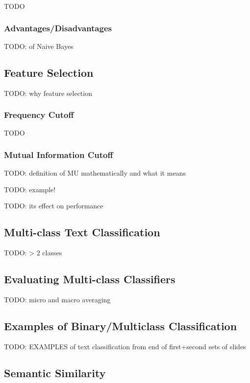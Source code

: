 \documentclass{article}
\begin{document}
TODO

\subsubsection{Advantages/Disadvantages}

TODO: of Naive Bayes

\subsection{Feature Selection}

TODO: why feature selection

\subsubsection{Frequency Cutoff}

TODO

\subsubsection{Mutual Information Cutoff}

TODO: definition of MU mathematically and what it means

TODO: example!

TODO: its effect on performance

\subsection{Multi-class Text Classification}

TODO: > 2 classes

\subsection{Evaluating Multi-class Classifiers}

TODO: micro and macro averaging

\subsection{Examples of Binary/Multiclass Classification}

TODO: EXAMPLES of text classification from end of first+second sets of slides

\subsection{Semantic Similarity}
\end{document}
